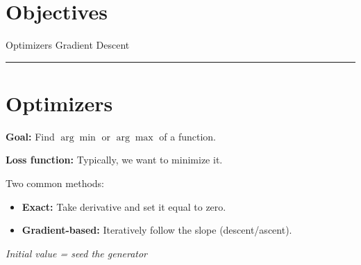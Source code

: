 \section*{Objectives}
\begin{outline}
    \1 Optimizers
    \1 Gradient Descent
\end{outline}

\rule[0.5ex]{\textwidth}{0.5pt}

\section*{Optimizers}

\textbf{Goal:} Find $\arg\min$ or $\arg\max$ of a function.

\textbf{Loss function:} Typically, we want to minimize it.

Two common methods:
\begin{itemize}
    \item \textbf{Exact:} Take derivative and set it equal to zero.
    \item \textbf{Gradient-based:} Iteratively follow the slope (descent/ascent).
\end{itemize}

\begin{center}
    \textit{Initial value = seed the generator}
\end{center}


